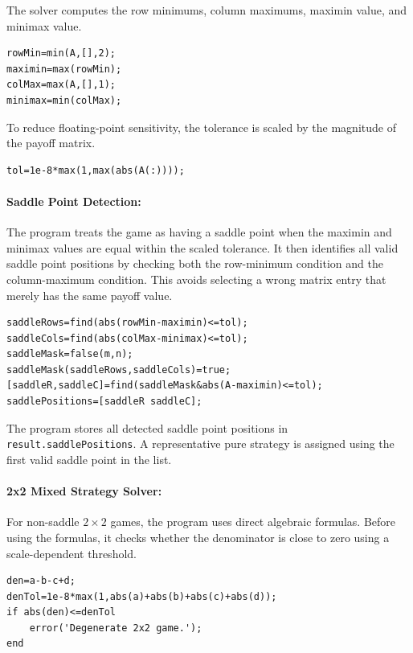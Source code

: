 The solver computes the row minimums, column maximums, maximin value, and minimax value.

\begin{lstlisting}[style=code]
rowMin=min(A,[],2);
maximin=max(rowMin);
colMax=max(A,[],1);
minimax=min(colMax);
\end{lstlisting}

To reduce floating-point sensitivity, the tolerance is scaled by the magnitude of the payoff matrix.

\begin{lstlisting}[style=code]
tol=1e-8*max(1,max(abs(A(:))));
\end{lstlisting}

\paragraph{Saddle Point Detection:}

The program treats the game as having a saddle point when the maximin and minimax values are equal within the scaled tolerance. It then identifies all valid saddle point positions by checking both the row-minimum condition and the column-maximum condition. This avoids selecting a wrong matrix entry that merely has the same payoff value.

\begin{lstlisting}[style=code]
saddleRows=find(abs(rowMin-maximin)<=tol);
saddleCols=find(abs(colMax-minimax)<=tol);
saddleMask=false(m,n);
saddleMask(saddleRows,saddleCols)=true;
[saddleR,saddleC]=find(saddleMask&abs(A-maximin)<=tol);
saddlePositions=[saddleR saddleC];
\end{lstlisting}

The program stores all detected saddle point positions in \texttt{result.saddlePositions}. A representative pure strategy is assigned using the first valid saddle point in the list.

\paragraph{2x2 Mixed Strategy Solver:}

For non-saddle \(2 \times 2\) games, the program uses direct algebraic formulas. Before using the formulas, it checks whether the denominator is close to zero using a scale-dependent threshold.

\begin{lstlisting}[style=code]
den=a-b-c+d;
denTol=1e-8*max(1,abs(a)+abs(b)+abs(c)+abs(d));
if abs(den)<=denTol
    error('Degenerate 2x2 game.');
end
\end{lstlisting}

